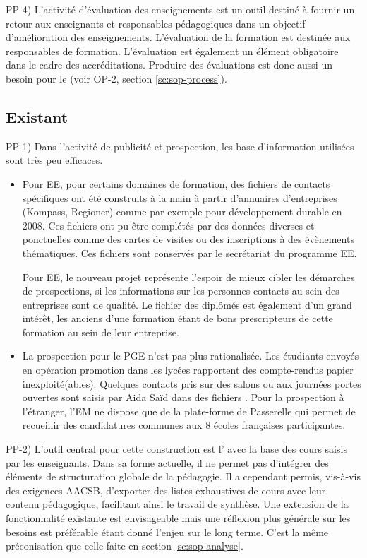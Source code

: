 \documentclass{book}
\begin{document}
PP-4) L'activité d'évaluation des enseignements est un outil destiné à fournir un 
retour aux enseignants et responsables pédagogiques dans un objectif d'amélioration
des enseignements. L'évaluation de la formation est destinée aux responsables de
formation.
L'évaluation est également  un élément obligatoire dans le cadre des accréditations. 
Produire des évaluations est donc aussi un besoin pour le \sop (voir OP-2, 
section \ref{sc:sop-process}). 


\subsection{Existant}

PP-1) Dans l'activité de publicité et prospection, les base d'information 
utilisées sont très peu efficaces. 
\begin{itemize}
\item Pour EE, pour certains domaines de formation, des fichiers de contacts 
spécifiques ont été construits à la main à partir d'annuaires d'entreprises 
(Kompass,  Regioner) comme par exemple pour développement durable en
2008. Ces fichiers ont pu être complétés par des données diverses et ponctuelles
comme des cartes de visites ou des inscriptions à des évènements thématiques.
Ces fichiers sont conservés par le secrétariat du programme EE.

Pour EE, le nouveau projet  représente l'espoir de mieux cibler les
démarches de prospections, si les informations sur les personnes contacts au sein 
des entreprises sont de qualité. Le fichier des diplômés est également d'un 
grand intérêt, les anciens d'une formation étant de bons prescripteurs de cette 
formation au sein de leur entreprise.

\item
La prospection pour le PGE n'est pas plus rationalisée. Les étudiants envoyés
en opération promotion dans les lycées rapportent des compte-rendus papier
inexploité(ables). Quelques contacts pris sur des salons ou aux journées portes
ouvertes sont saisis par Aida Saïd dans des fichiers . Pour la prospection
à l'étranger, l'EM ne dispose que de la plate-forme  de Passerelle
qui permet de recueillir des candidatures communes aux 8 écoles françaises 
participantes. \\
\end{itemize}


PP-2) L'outil central pour cette construction est l' avec 
la base des cours saisis par les enseignants. Dans sa forme actuelle, il 
ne permet pas d'intégrer des éléments de structuration globale de la pédagogie. 
Il a cependant permis, vis-à-vis des exigences AACSB, d'exporter des listes 
exhaustives de cours avec leur contenu pédagogique, facilitant ainsi le
travail de synthèse. Une extension de la fonctionnalité existante est 
envisageable mais une réflexion plus générale sur les besoins est préférable 
étant donné l'enjeu sur le long terme. C'est la même préconisation que celle 
faite en section \ref{sc:sop-analyse}.
\end{document}
